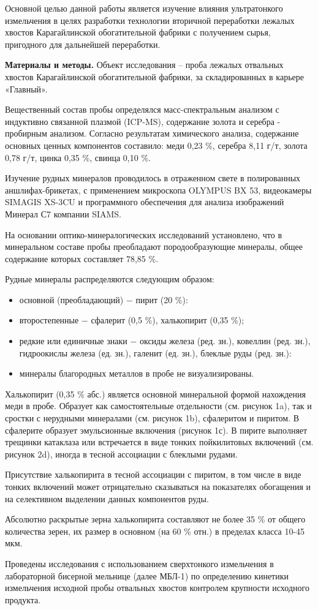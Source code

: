 \begin{multicols}{2}
Основной целью данной работы является изучение влияния ультратонкого
измельчения в целях разработки технологии вторичной переработки лежалых
хвостов Карагайлинской обогатительной фабрики с получением сырья,
пригодного для дальнейшей переработки.

{\bfseries Материалы и методы.} Объект исследования -- проба лежалых
отвальных хвостов Карагайлинской обогатительной фабрики, за
складированных в карьере «Главный».

Вещественный состав пробы определялся масс-спектральным анализом с
индуктивно связанной плазмой (ICP-MS), содержание золота и серебра -
пробирным анализом. Согласно результатам химического анализа, содержание
основных ценных компонентов составило: меди 0,23 \%, серебра 8,11 г/т,
золота 0,78 г/т, цинка 0,35 \%, свинца 0,10 \%.

Изучение рудных минералов проводилось в отраженном свете в полированных
аншлифах-брикетах, с применением микроскопа OLYMPUS BX 53, видеокамеры
SIMAGIS XS-3CU и программного обеспечения для анализа изображений
Минерал С7 компании SIAMS.

На основании оптико-минералогических исследований установлено, что в
минеральном составе пробы преобладают породообразующие минералы, общее
содержание которых составляет 78,85 \%.

Рудные минералы распределяются следующим образом:

\begin{itemize}
\item
  основной (преобладающий) − пирит (20 \%):
\item
  второстепенные − сфалерит (0,5 \%), халькопирит (0,35 \%);
\item
  редкие или единичные знаки − оксиды железа (ред. зн.), ковеллин (ред.
  зн.), гидроокислы железа (ед. зн.), галенит (ед. зн.), блеклые руды
  (ред. зн.):
\item
  минералы благородных металлов в пробе не визуализированы.
\end{itemize}

Халькопирит (0,35 \% абс.) является основной минеральной формой
нахождения меди в пробе. Образует как самостоятельные отдельности (см.
рисунок 1a), так и сростки с нерудными минералами (см. рисунок 1b),
сфалеритом и пиритом. В сфалерите образует эмульсионные включения
(рисунок 1с). В пирите выполняет трещинки катаклаза или встречается в
виде тонких пойкилитовых включений (см. рисунок 2d), иногда в тесной
ассоциации с блеклыми рудами.

Присутствие халькопирита в тесной ассоциации с пиритом, в том числе в
виде тонких включений может отрицательно сказываться на показателях
обогащения и на селективном выделении данных компонентов руды.

Абсолютно раскрытые зерна халькопирита составляют не более 35 \% от
общего количества зерен, их размер в основном (на 60 \% отн.) в пределах
класса 10-45 мкм.

Проведены исследования с использованием сверхтонкого измельчения в
лабораторной бисерной мельнице (далее МБЛ-1) по определению кинетики
измельчения исходной пробы отвальных хвостов контролем крупности
исходного продукта.
\end{multicols}

